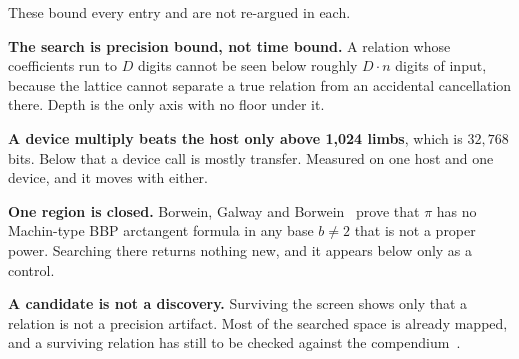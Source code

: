 These bound every entry and are not re-argued in each.

\textbf{The search is precision bound, not time bound.} A relation whose coefficients run to \(D\)
digits cannot be seen below roughly \(D \cdot n\) digits of input, because the lattice cannot separate a
true relation from an accidental cancellation there. Depth is the only axis with no floor under it.

\textbf{A device multiply beats the host only above 1,024 limbs}, which is \(32{,}768\) bits. Below
that a device call is mostly transfer. Measured on one host and one device, and it moves with either.

\textbf{One region is closed.} Borwein, Galway and Borwein~\cite{src:Borwein} prove that \(\pi\) has no
Machin-type BBP arctangent formula in any base \(b \neq 2\) that is not a proper power. Searching there
returns nothing new, and it appears below only as a control.

\textbf{A candidate is not a discovery.} Surviving the screen shows only that a relation is not a
precision artifact. Most of the searched space is already mapped, and a surviving relation has still
to be checked against the compendium~\cite{src:Bailey-2023}.
